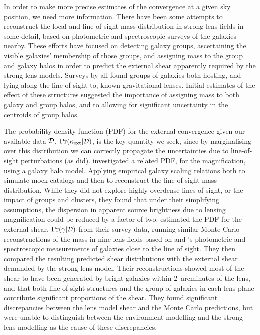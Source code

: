 \documentclass[useAMS,usenatbib]{mn2e}
\begin{document}
In order to make more precise estimates of the convergence at a given
sky position, we need more information.   There have been some attempts
to reconstruct the local and line of sight mass distribution in strong
lens fields in some detail, based on photometric and spectroscopic
surveys of the galaxies nearby. These efforts have focused on  detecting
galaxy groups, ascertaining the visible galaxies' membership of those
groups, and assigning mass to the group and galaxy halos in order to
predict the external shear apparently required by the strong lens
models. Surveys by
\citet{Fassnacht+Lubin2002,AugerEtal2007,WilliamsEtal2006,MomchevaEtal2006}
all found groups of galaxies both hosting, and lying  along the line of
sight to, known gravitational lenses. Initial estimates of the effect of
these structures suggested the importance of assigning mass to both
galaxy and group halos, and to allowing for significant uncertainty in
the centroids of group halos. 

The probability density function (PDF) for the external convergence
given our available data ${\mathcal{D}}$, $\Pr(\kappa_{\rm ext}|{\mathcal{D}})$,  is the  key
quantity we seek, since by marginalising over this distribution we can
correctly propagate the uncertainties due to line-of-sight perturbations
(as \citeauthor{FadelyEtal2009} did).  
%
\citet{GunnarssonEtal2006} investigated a related PDF,  for the
magnification, using a galaxy halo model. Applying empirical galaxy
scaling relations both to simulate mock catalogs and then to reconstruct
the line of sight mass distribution. While they did not explore highly
overdense lines of sight, or the impact of groups and clusters, they
found that under their simplifying assumptions, the dispersion in
apparent source brightness due to lensing magnification could be reduced
by a factor of two.
%
\citet{WongEtal2011} estimated the PDF for the external shear,
$\Pr(\gamma|{\mathcal{D}})$ from their survey data, running similar Monte Carlo
reconstructions of the mass in nine lens fields based on
\citeauthor{WilliamsEtal2006} and \citeauthor{MomchevaEtal2006}'s
photometric and spectroscopic measurements of galaxies close to the line
of sight. They then  compared the resulting predicted shear
distributions with the external shear demanded by the strong lens model.
Their reconstructions showed most of the shear to have been generated by
bright galaxies within 2~arcminutes of the lens, and that both line of
sight structures and the group of galaxies in each lens plane contribute
significant proportions of the shear. They found significant
discrepancies between the lens model shear and the Monte Carlo
predictions, but were unable to distinguish between the environment
modelling and the strong lens modelling as the cause of these
discrepancies.
\end{document}
